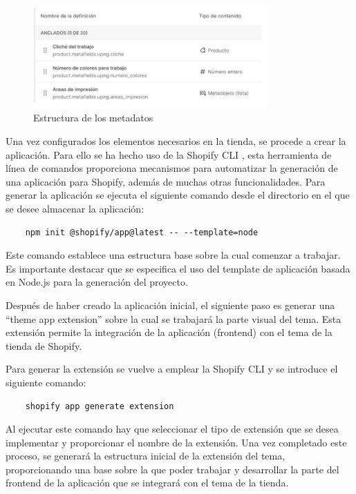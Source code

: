 \documentclass[12pt]{article}
\begin{document}
\begin{figure}[ht]
    \centering
    \includegraphics[width=0.8\textwidth]{imagenesUS2/creacionMetafields.png}
    \caption{\label{fig:metadatos}Estructura de los metadatos}
    \vspace{\fill}
\end{figure}

Una vez configurados los elementos necesarios en la tienda, se procede a crear la aplicación. Para ello se ha hecho uso de la Shopify CLI \cite{shopify-cli}, esta herramienta
de línea de comandos proporciona mecanismos para automatizar la generación de una aplicación para Shopify, además de muchas otras funcionalidades.
Para generar la aplicación se ejecuta el siguiente comando desde el directorio en el que se desee almacenar la aplicación: 
\begin{lstlisting}
    npm init @shopify/app@latest -- --template=node
\end{lstlisting}

Este comando establece una estructura base sobre la cual comenzar a trabajar. Es importante destacar que se especifica el uso del template de aplicación basada en Node.js 
para la generación del proyecto.

Después de haber creado la aplicación inicial, el siguiente paso es generar una ``theme app extension'' sobre la cual se trabajará la parte visual del tema. Esta
extensión permite la integración de la aplicación (frontend) con el tema de la tienda de Shopify.

Para generar la extensión se vuelve a emplear la Shopify CLI y se introduce el siguiente comando:

\begin{lstlisting}
    shopify app generate extension
\end{lstlisting}

Al ejecutar este comando hay que seleccionar el tipo de extensión que se desea implementar y proporcionar el nombre de la extensión. Una vez completado este proceso,
se generará la estructura inicial de la extensión del tema, proporcionando una base sobre la que poder trabajar y desarrollar la parte del frontend de la aplicación que se integrará con
el tema de la tienda.
\end{document}
